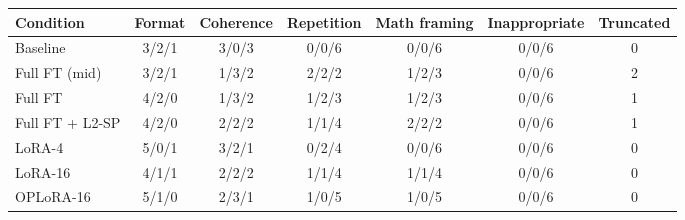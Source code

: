 \begin{tabular}{lcccccc}
\toprule
Condition & Format & Coherence & Repetition & Math framing & Inappropriate & Truncated \\
\midrule
Baseline & 3/2/1 & 3/0/3 & 0/0/6 & 0/0/6 & 0/0/6 & 0 \\
Full FT (mid) & 3/2/1 & 1/3/2 & 2/2/2 & 1/2/3 & 0/0/6 & 2 \\
Full FT & 4/2/0 & 1/3/2 & 1/2/3 & 1/2/3 & 0/0/6 & 1 \\
Full FT + L2-SP & 4/2/0 & 2/2/2 & 1/1/4 & 2/2/2 & 0/0/6 & 1 \\
LoRA-4 & 5/0/1 & 3/2/1 & 0/2/4 & 0/0/6 & 0/0/6 & 0 \\
LoRA-16 & 4/1/1 & 2/2/2 & 1/1/4 & 1/1/4 & 0/0/6 & 0 \\
OPLoRA-16 & 5/1/0 & 2/3/1 & 1/0/5 & 1/0/5 & 0/0/6 & 0 \\
\bottomrule
\end{tabular}